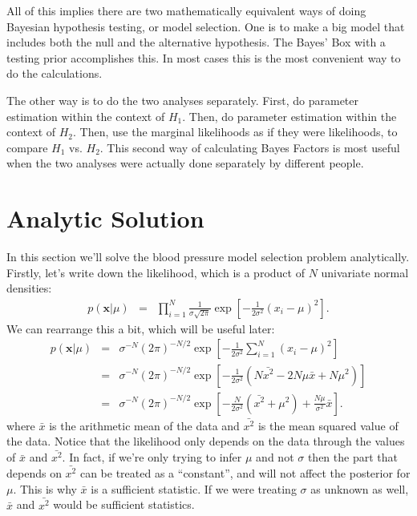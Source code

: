 All of this implies
there are two mathematically equivalent ways of doing Bayesian hypothesis testing,
or model selection. One is to make a big model that includes both the null and
the alternative hypothesis. The Bayes' Box with a testing prior accomplishes this.
In most cases this is the most convenient way to do the calculations.

The other way is to do the two analyses separately. First, do parameter estimation
within the context of $H_1$. Then, do parameter estimation within the context
of $H_2$. Then, use the marginal likelihoods as if they were likelihoods, to
compare $H_1$ vs. $H_2$. This second way of calculating Bayes Factors is
most useful when the two analyses were actually done separately by different
people.

\section{Analytic Solution}
In this section we'll solve the blood pressure model selection problem
analytically. Firstly, let's write down the likelihood,
which is a product of $N$ univariate normal densities:
\begin{eqnarray}
p(\boldsymbol{x} | \mu) &=&
\prod_{i=1}^N \frac{1}{\sigma\sqrt{2\pi}}
\exp
\left[-\frac{1}{2\sigma^2}\left(x_i - \mu\right)^2\right].
\end{eqnarray}
We can rearrange this a bit, which will be useful later:
\begin{eqnarray}
p(\boldsymbol{x} | \mu) &=& \sigma^{-N}(2\pi)^{-N/2}
\exp
\left[-\frac{1}{2\sigma^2}\sum_{i=1}^N\left(x_i - \mu\right)^2\right]\\
&=& \sigma^{-N}(2\pi)^{-N/2}
\exp
\left[-\frac{1}{2\sigma^2}\left(N\bar{x^2} - 2N\mu\bar{x} + N\mu^2\right)\right]\\
&=& \sigma^{-N}(2\pi)^{-N/2}
\exp
\left[-\frac{N}{2\sigma^2}\left(\bar{x^2} + \mu^2\right) + \frac{N\mu}{\sigma^2}\bar{x}\right].\label{eq:lik_simplified}
\end{eqnarray}
where $\bar{x}$ is the arithmetic mean of the data and $\bar{x^2}$ is the mean
squared value of the data. Notice that the likelihood only depends on the data
through the values of $\bar{x}$ and $\bar{x^2}$. In fact, if we're only trying
to infer $\mu$ and not $\sigma$ then the part that depends on $\bar{x^2}$
can be treated as a ``constant'', and will not affect the posterior for $\mu$.
This is why $\bar{x}$ is a sufficient statistic. If we were treating $\sigma$
as unknown as well, $\bar{x}$ and $\bar{x^2}$ would be sufficient statistics.


